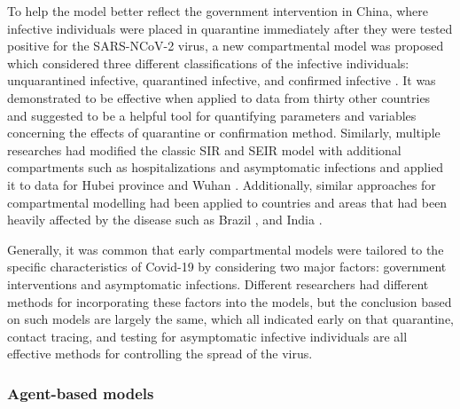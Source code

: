 To help the model better reflect the government intervention in China, where infective individuals were placed in quarantine immediately after they were tested positive for the SARS-NCoV-2 virus, a new compartmental model was proposed which considered three different classifications of the infective individuals: unquarantined infective, quarantined infective, and confirmed infective \cite{zhaoModelingEpidemicDynamics2020}.
It was demonstrated to be effective when applied to data from thirty other countries and suggested to be a helpful tool for quantifying parameters and variables concerning the effects of quarantine or confirmation method.
Similarly, multiple researches had modified the classic \gls{SIR} and \gls{SEIR} model with additional compartments such as hospitalizations and asymptomatic infections and applied it to data for Hubei province \cite{heSEIRModelingCOVID192020} and Wuhan \cite{ndairouMathematicalModelingCOVID192020}.
Additionally, similar approaches for compartmental modelling had been applied to countries and areas that had been heavily affected by the disease such as Brazil \cite{bastosModelingForecastingEarly2020}, and India \cite{sarkarModelingForecastingCOVID192020}.

Generally, it was common that early compartmental models were tailored to the specific characteristics of Covid-19 by considering two major factors: government interventions and asymptomatic infections.
Different researchers had different methods for incorporating these factors into the models, but the conclusion based on such models are largely the same, which all indicated early on that quarantine, contact tracing, and testing for asymptomatic infective individuals are all effective methods for controlling the spread of the virus.

\subsubsection{Agent-based models}

